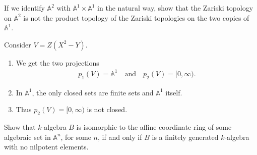 \begin{exercise}
    If we identify \(\mathbb{A}^2\) with \(\mathbb{A}^1 \times \mathbb{A}^1\) in the natural way, show that the Zariski topology on \(\mathbb{A}^2\) is not the product topology of the Zariski topologies on the two copies of \(\mathbb{A}^1\).
\end{exercise}
\begin{solution}
    Consider \(V = Z(X^2 - Y)\).
    \begin{enumerate}
        \item We get the two projections
        \begin{align*}
            p_1(V) = \mathbb{A}^1 \quad \text{and} \quad p_2(V) = [0, \infty) \text{.}
        \end{align*}
        \item In \(\mathbb{A}^1\), the only closed sets are finite sets and \(\mathbb{A}^1\) itself.
        \item Thus \(p_2(V) = [0, \infty)\) is not closed.
    \end{enumerate}
\end{solution}
%
%
\begin{exercise}[1.5.]
    Show that \(k\)-algebra \(B\) is isomorphic to the affine coordinate ring of some algebraic set in \(\mathbb{A}^n\), for some \(n\), if and only if \(B\) is a finitely generated \(k\)-algebra with no nilpotent elements.
\end{exercise}
